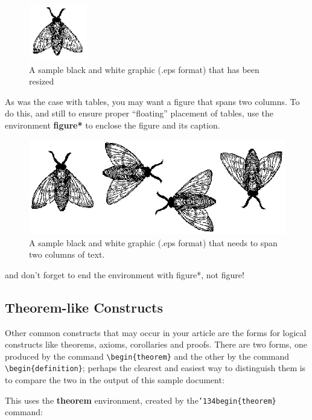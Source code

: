\documentclass[acmtog, authorversion]{acmart}
\begin{document}
\begin{figure}
    \centering
    \includegraphics[height=1in, width=1in]{fly.eps} 
    \caption{A sample black and white graphic (.eps format) that has been resized}
    \label{fig:flies}
\end{figure}




As was the case with tables, you may want a figure that spans two
columns.  To do this, and still to ensure proper ``floating''
placement of tables, use the environment \textbf{figure*} to
enclose the figure and its caption.
\begin{figure}
    \centering 
    \includegraphics{flies.eps} 
    \caption{A sample black and white graphic (.eps format) that needs to span two columns of text.}
\end{figure}
and don't forget to end the environment with {figure*}, not
{figure}!


\subsection{Theorem-like Constructs}
Other common constructs that may occur in your article are the
forms for logical constructs like theorems, axioms, corollaries
and proofs.  There are two forms, one produced by the command
\texttt{\textbackslash begin\{theorem\}} and the other by the command
\texttt{\textbackslash begin\{definition\}}; perhaps the clearest and easiest way
to distinguish them is to compare the two in the output of this
sample document:

This uses the \textbf{theorem} environment, created by
the\linebreak\texttt{{\char'134}begin\{theorem\}} command:
\end{document}
